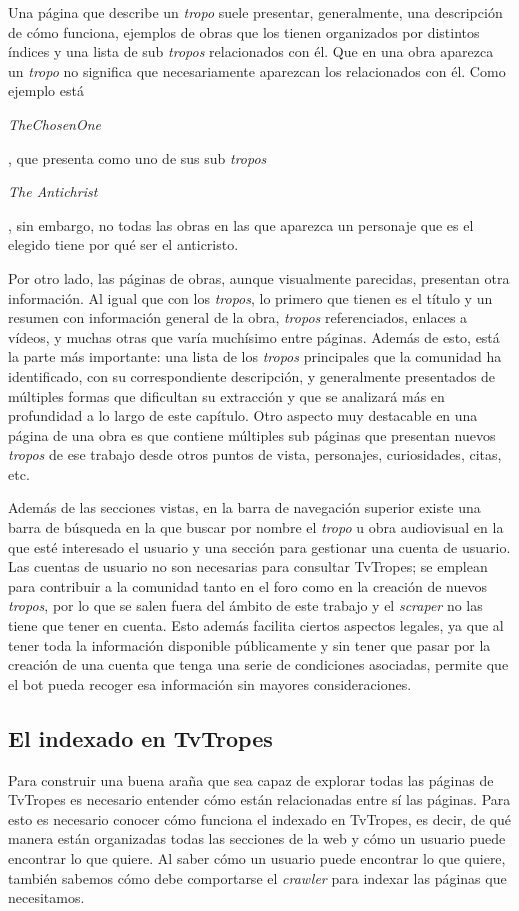 Una página que describe un \textit{tropo} suele presentar, generalmente, una
descripción de cómo funciona, ejemplos de obras que los tienen organizados por
distintos índices y una lista de sub \textit{tropos} relacionados con él. Que en
una obra aparezca un \textit{tropo} no significa que necesariamente aparezcan
los relacionados con él. Como ejemplo está
\begin{otherlanguage}{english}\textit{TheChosenOne}\end{otherlanguage}, que
presenta como uno de sus sub \textit{tropos}
\begin{otherlanguage}{english}\textit{The Antichrist}\end{otherlanguage}, sin
embargo, no todas las obras en las que aparezca un personaje que es el elegido
tiene por qué ser el anticristo.

Por otro lado, las páginas de obras, aunque visualmente parecidas, presentan
otra información. Al igual que con los \textit{tropos}, lo primero que tienen es
el título y un resumen con información general de la obra, \textit{tropos}
referenciados, enlaces a vídeos, y muchas otras que varía muchísimo entre
páginas. Además de esto, está la parte más importante: una lista de los
\textit{tropos} principales que la comunidad ha identificado, con su
correspondiente descripción, y generalmente presentados de múltiples formas que
dificultan su extracción y que se analizará más en profundidad a lo largo de
este capítulo. Otro aspecto muy destacable en una página de una obra es que
contiene múltiples sub páginas que presentan nuevos \textit{tropos} de ese
trabajo desde otros puntos de vista, personajes, curiosidades, citas, etc.

Además de las secciones vistas, en la barra de navegación superior existe una
barra de búsqueda en la que buscar por nombre el \textit{tropo} u obra
audiovisual en la que esté interesado el usuario y una sección para gestionar
una cuenta de usuario. Las cuentas de usuario no son necesarias para consultar
TvTropes; se emplean para contribuir a la comunidad tanto en el foro como en la
creación de nuevos \textit{tropos}, por lo que se salen fuera del ámbito de este
trabajo y el \textit{scraper} no las tiene que tener en cuenta. Esto además
facilita ciertos aspectos legales, ya que al tener toda la información
disponible públicamente y sin tener que pasar por la creación de una cuenta que
tenga una serie de condiciones asociadas, permite que el bot pueda recoger esa
información sin mayores consideraciones.

\subsection{El indexado en TvTropes}
Para construir una buena araña que sea capaz de explorar todas las páginas de
TvTropes es necesario entender cómo están relacionadas entre sí las páginas.
Para esto es necesario conocer cómo funciona el indexado en TvTropes, es decir,
de qué manera están organizadas todas las secciones de la web y cómo un usuario
puede encontrar lo que quiere. Al saber cómo un usuario puede encontrar lo que
quiere, también sabemos cómo debe comportarse el \textit{crawler} para indexar
las páginas que necesitamos.

